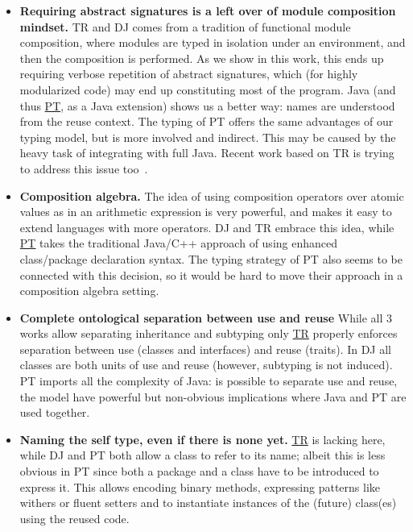 \begin{itemize}
\item 
{\bf Requiring abstract signatures is a left over of module composition mindset.}
TR and DJ comes from a tradition of functional module composition, where 
modules are typed in isolation under an environment, and then the composition is performed.
As we show in this work, this ends up requiring verbose repetition of abstract signatures,
which (for highly modularized code) may end up constituting most of the program.
Java (and thus \underline{PT}, as a Java extension) shows us a better way:
names are understood from the reuse context.
The typing of PT offers the same advantages of our typing model, 
but is more involved and indirect. This may be caused by the
heavy task of integrating with full Java.
Recent work based on TR is trying to address this issue too~\cite{damiani2017unified}.
\item {\bf Composition algebra.}
The idea of using composition operators over atomic values as in an arithmetic expression is very powerful,
and makes it easy to extend languages with more operators. DJ and TR embrace this idea, while \underline{PT} takes the traditional Java/C++ approach of using enhanced class/package declaration syntax.
The typing strategy of PT also seems to be connected with this
decision, so it would be hard to move their approach in a composition
algebra setting.
\item {\bf Complete ontological separation between use and reuse}
While all 3 works allow separating inheritance and subtyping only \underline{TR} properly enforces 
separation between use (classes and interfaces) and reuse (traits).
In DJ all classes are both units of use and reuse (however, subtyping is not induced).
PT imports all the complexity of Java: is possible to separate use and reuse, the model have powerful but non-obvious implications where Java \Q@extends@ and PT are used together.
\item {\bf Naming the self type, even if there is none yet.}
\underline{TR} is lacking here, while DJ and PT both allow a class to refer to its name; albeit this is
less obvious in PT since both a package and a class have to be introduced to express it.
This allows encoding binary methods, expressing patterns like withers or fluent setters and to instantiate instances of the (future) class(es)  using the reused code.
\end{itemize}
\saveSpace
